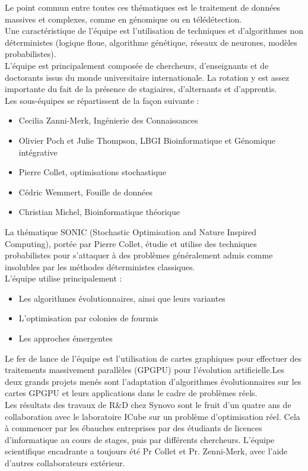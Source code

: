 \documentclass[french, 11pt]{memoir}
\begin{document}
\bigskip
Le point commun entre toutes ces thématiques est le traitement de données
massives et complexes, comme en génomique ou en télédétection. \\
Une caractéristique de l'équipe est l'utilisation de techniques et
d'algorithmes non déterministes (logique floue, algorithme génétique,
réseaux de neurones, modèles probabilistes). \\
L'équipe est principalement
composée de chercheurs, d'enseignants et de doctorants issus du monde
universitaire internationale. La rotation y est assez importante du fait
de la présence de stagiaires, d'alternants et d'apprentis. \\
Les sous-équipes se répartissent de la façon suivante :

\begin{itemize}
	\item
	Cecilia Zanni-Merk, Ingénierie des Connaissances
	\item
	Olivier Poch et Julie Thompson, LBGI Bioinformatique et Génomique
	intégrative
	\item
	Pierre Collet, optimisations stochastique
	\item
	Cédric Wemmert, Fouille de données
	\item
	Christian Michel, Bioinformatique théorique
\end{itemize}
\bigskip
La thématique SONIC (Stochastic Optimisation and Nature Inspired
Computing), portée par Pierre Collet, étudie et utilise des techniques
probabilistes pour s'attaquer à des problèmes généralement admis comme
insolubles par les méthodes déterministes classiques.\\
L'équipe utilise principalement :

\begin{itemize}
	\item
	Les algorithmes évolutionnaires, ainsi que leurs variantes
	\item
	L'optimisation par colonies de fourmis
	\item
	Les approches émergentes
\end{itemize}
\bigskip
Le fer de lance de l'équipe est l'utilisation de cartes graphiques pour
effectuer des traitements massivement parallèles (GPGPU) pour
l'évolution artificielle.Les deux grands projets menés sont l'adaptation
d'algorithmes évolutionnaires sur les cartes GPGPU et leurs applications
dans le cadre de problèmes réels.\\
Les résultats des travaux de R\&D chez
Synovo sont le fruit d'un quatre ans de collaboration avec le
laboratoire ICube sur un problème d'optimisation réel. Cela à commencer
par les ébauches entreprises par des étudiants de licences
d'informatique au cours de stages, puis par différents chercheurs.
L'équipe scientifique encadrante a toujours été Pr Collet et Pr.
Zenni-Merk, avec l'aide d'autres collaborateurs extérieur.
\end{document}
